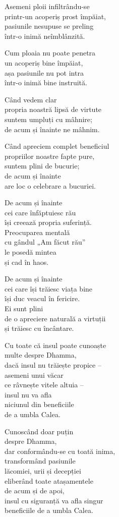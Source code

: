 Asemeni ploii infiltrându-se\\
printr-un acoperiș prost împăiat,\\
pasiunile nesupuse se preling\\
într-o inimă neîmblânzită.


Cum ploaia nu poate penetra\\
un acoperiș bine împăiat,\\
așa pasiunile nu pot intra\\
într-o inimă bine instruită.


Când vedem clar\\
propria noastră lipsă de virtute\\
suntem umpluți cu mâhnire;\\
de acum și înainte ne mâhnim.


Când apreciem complet beneficiul\\
propriilor noastre fapte pure,\\
suntem plini de bucurie;\\
de acum și înainte\\
are loc o celebrare a bucuriei.

De acum și înainte\\
cei care înfăptuiesc rău\\
își creează propria suferință.\\
Preocuparea mentală\\
cu gândul „Am făcut rău”\\
le posedă mintea\\
și cad în haos.


De acum și înainte\\
cei care își trăiesc viața bine\\
își duc veacul în fericire.\\
Ei sunt plini\\
de o apreciere naturală a virtuții\\
și trăiesc cu încântare.


Cu toate că insul poate cunoaște\\
multe despre Dhamma,\\
dacă insul nu trăiește propice –\\
asemeni unui văcar\\
ce râvnește vitele altuia –\\
insul nu va afla\\
niciunul din beneficiile\\
de a umbla Calea.


Cunoscând doar puțin\\
despre Dhamma,\\
dar conformându-se cu toată inima,\\
transformând pasiunile\\
lăcomiei, urii și decepției\\
eliberând toate atașamentele\\
de acum și de apoi,\\
insul cu siguranță va afla singur\\
beneficiile de a umbla Calea.
